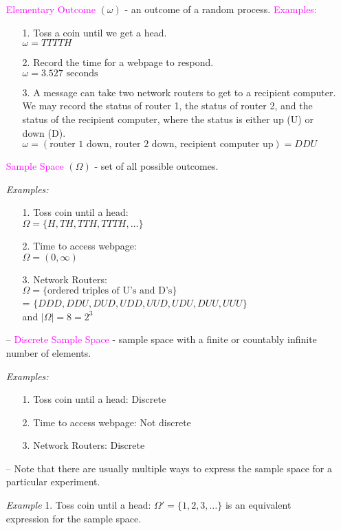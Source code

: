 \documentclass[20pt,landscape]{foils}
\newcommand{\no}{\noindent}
\newcommand \h {\hspace*{.3in}}
\newcommand{\bul}{\hspace*{.3in}{\textcolor{red}{$\bullet$ \ }}}
\begin{document}
\foilhead[-.7in]{\textcolor{blue}{Components of Random Experiments}}
\begin{itemize}
\item[\bul] \textcolor{magenta}{Elementary Outcome} $(\omega)$ - an outcome of a random process.
\no  \textcolor{magenta}{Examples:}
\begin{enumerate}
\item[1.] Toss a coin until we get a head. \\[.1in]
 $\omega = TTTTH$
\item[2.] Record the time for a webpage to respond. \\[.1in]
$\omega = 3.527 \mbox{ seconds} $
\item[3.] A message can take two network routers to get to a recipient computer. We may record the status of router 1, the status of router 2, and the status of the recipient computer, where the status is either up (U) or down (D). \\[.1in]
$\omega = (\mbox{router 1 down, router 2 down, recipient computer up}) = DDU$
\end{enumerate}
\foilhead[-.7in]{\textcolor{blue}{Components of Random Experiments (Continued)}}
\item[\bul] \textcolor{magenta}{Sample Space} $(\Omega)$ - set of all possible outcomes. 

\no \emph{Examples:}
\begin{enumerate}
\item[1.] Toss coin until a head:\\[.1in] 
$\Omega = \{H, TH, TTH, TTTH,\ldots\}$
\item[2.] Time to access webpage:\\[.1in] 
$\Omega = (0,\infty)$
\item[3.] Network Routers:\\[.1in] 
$\Omega = \{\mbox{ordered triples of U's and D's}\}$\\
\h \h \h \h = $\{DDD, DDU, DUD, UDD, UUD, UDU, DUU, UUU\}$\\
and 					 $ |\Omega|=8 = 2^{3} $					 
\end{enumerate}
\end{itemize}
\newpage
\begin{itemize}
\item[--] \textcolor{magenta}{Discrete Sample Space} - sample space with a finite or countably infinite number of elements.
 
\no \emph{Examples:}
\begin{itemize}
\item[1.] Toss coin until a head: Discrete
\item[2.] Time to access webpage: Not discrete
\item[3.] Network Routers: Discrete
\end{itemize}

\item[--] Note that there are usually multiple ways to express the sample space for a particular experiment. 

\emph{Example} 1. Toss coin until a head: $\Omega' = \{1, 2, 3, \ldots\}$ is an equivalent expression for the sample space. 
\end{itemize}
\end{document}
